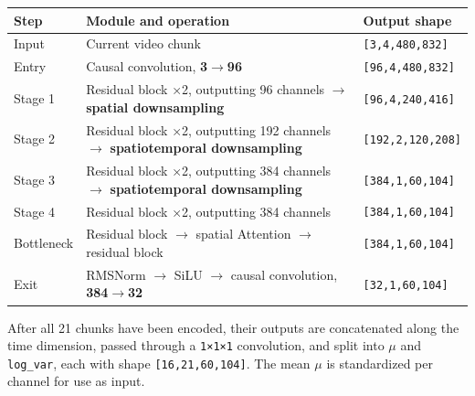 \documentclass[
  11pt,
  a4paper,
]{article}
\newcounter{none} %
\begin{document}
{\def\LTcaptype{none} %
\begin{longtable}[]{@{}
  >{\raggedright\arraybackslash}p{}
  >{\raggedright\arraybackslash}p{}
  >{\raggedright\arraybackslash}p{}@{}}
\toprule\noalign{}
\begin{minipage}[b]{\linewidth}\raggedright
Step
\end{minipage} & \begin{minipage}[b]{\linewidth}\raggedright
Module and operation
\end{minipage} & \begin{minipage}[b]{\linewidth}\raggedright
Output shape
\end{minipage} \\
\midrule\noalign{}
\endhead
\bottomrule\noalign{}
\endlastfoot
Input & Current video chunk & \texttt{{[}3,4,480,832{]}} \\
Entry & Causal convolution, \textbf{3\(\rightarrow\)96} &
\texttt{{[}96,4,480,832{]}} \\
Stage 1 & Residual block ×2, outputting 96 channels \(\rightarrow\)
\textbf{spatial downsampling} & \texttt{{[}96,4,240,416{]}} \\
Stage 2 & Residual block ×2, outputting 192 channels \(\rightarrow\)
\textbf{spatiotemporal downsampling} & \texttt{{[}192,2,120,208{]}} \\
Stage 3 & Residual block ×2, outputting 384 channels \(\rightarrow\)
\textbf{spatiotemporal downsampling} & \texttt{{[}384,1,60,104{]}} \\
Stage 4 & Residual block ×2, outputting 384 channels &
\texttt{{[}384,1,60,104{]}} \\
Bottleneck & Residual block \(\rightarrow\) spatial Attention
\(\rightarrow\) residual block & \texttt{{[}384,1,60,104{]}} \\
Exit & RMSNorm \(\rightarrow\) SiLU \(\rightarrow\) causal convolution,
\textbf{384\(\rightarrow\)32} & \texttt{{[}32,1,60,104{]}} \\
\end{longtable}
}

\endgroup

After all 21 chunks have been encoded, their outputs are concatenated
along the time dimension, passed through a \texttt{1×1×1} convolution,
and split into \(\mu\) and \texttt{log\_var}, each with shape
\texttt{{[}16,21,60,104{]}}. The mean \(\mu\) is standardized per
channel for use as input.
\end{document}

